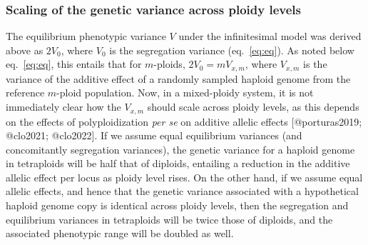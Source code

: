 \hypertarget{scaling-of-the-genetic-variance-across-ploidy-levels}{%
\subsubsection{Scaling of the genetic variance across ploidy
levels}\label{scaling-of-the-genetic-variance-across-ploidy-levels}}

The equilibrium phenotypic variance \(V\) under the infinitesimal model
was derived above as \(2V_0\), where \(V_0\) is the segregation variance
(eq.~\ref{eq:eq}). As noted below eq.~\ref{eq:eq}, this entails that for
\(m\)-ploids, \(2V_0 = mV_{x,m}\), where \(V_{x,m}\) is the variance of
the additive effect of a randomly sampled haploid genome from the
reference \(m\)-ploid population. Now, in a mixed-ploidy system, it is
not immediately clear how the \(V_{x,m}\) should scale across ploidy
levels, as this depends on the effects of polyploidization \emph{per se}
on additive allelic effects {[}@porturas2019; @clo2021; @clo2022{]}. If
we assume equal equilibrium variances (and concomitantly segregation
variances), the genetic variance for a haploid genome in tetraploids
will be half that of diploids, entailing a reduction in the additive
allelic effect per locus as ploidy level rises. On the other hand, if we
assume equal allelic effects, and hence that the genetic variance
associated with a hypothetical haploid genome copy is identical across
ploidy levels, then the segregation and equilibrium variances in
tetraploids will be twice those of diploids, and the associated
phenotypic range will be doubled as well.

